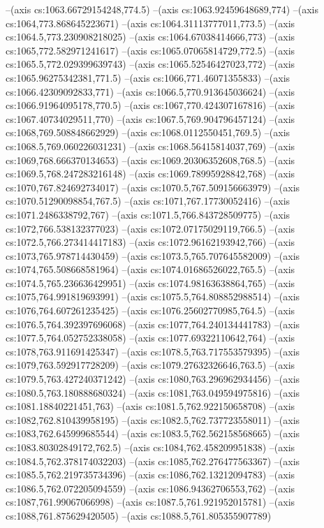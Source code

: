 --(axis cs:1063.66729154248,774.5)
--(axis cs:1063.92459648689,774)
--(axis cs:1064,773.868645223671)
--(axis cs:1064.31113777011,773.5)
--(axis cs:1064.5,773.230908218025)
--(axis cs:1064.67038414666,773)
--(axis cs:1065,772.582971241617)
--(axis cs:1065.07065814729,772.5)
--(axis cs:1065.5,772.029399639743)
--(axis cs:1065.52546427023,772)
--(axis cs:1065.96275342381,771.5)
--(axis cs:1066,771.46071355833)
--(axis cs:1066.42309092833,771)
--(axis cs:1066.5,770.913645036624)
--(axis cs:1066.91964095178,770.5)
--(axis cs:1067,770.424307167816)
--(axis cs:1067.40734029511,770)
--(axis cs:1067.5,769.904796457124)
--(axis cs:1068,769.508848662929)
--(axis cs:1068.0112550451,769.5)
--(axis cs:1068.5,769.060226031231)
--(axis cs:1068.56415814037,769)
--(axis cs:1069,768.666370134653)
--(axis cs:1069.20306352608,768.5)
--(axis cs:1069.5,768.247283216148)
--(axis cs:1069.78995928842,768)
--(axis cs:1070,767.824692734017)
--(axis cs:1070.5,767.509156663979)
--(axis cs:1070.51290098854,767.5)
--(axis cs:1071,767.17730052416)
--(axis cs:1071.2486338792,767)
--(axis cs:1071.5,766.843728509775)
--(axis cs:1072,766.538132377023)
--(axis cs:1072.07175029119,766.5)
--(axis cs:1072.5,766.273414417183)
--(axis cs:1072.96162193942,766)
--(axis cs:1073,765.978714430459)
--(axis cs:1073.5,765.707645582009)
--(axis cs:1074,765.508668581964)
--(axis cs:1074.01686526022,765.5)
--(axis cs:1074.5,765.236636429951)
--(axis cs:1074.98163638864,765)
--(axis cs:1075,764.991819693991)
--(axis cs:1075.5,764.808852988514)
--(axis cs:1076,764.607261235425)
--(axis cs:1076.25602770985,764.5)
--(axis cs:1076.5,764.392397696068)
--(axis cs:1077,764.240134441783)
--(axis cs:1077.5,764.052752338058)
--(axis cs:1077.69322110642,764)
--(axis cs:1078,763.911691425347)
--(axis cs:1078.5,763.717553579395)
--(axis cs:1079,763.592917728209)
--(axis cs:1079.27632326646,763.5)
--(axis cs:1079.5,763.427240371242)
--(axis cs:1080,763.296962934456)
--(axis cs:1080.5,763.180888680324)
--(axis cs:1081,763.049594975816)
--(axis cs:1081.18840221451,763)
--(axis cs:1081.5,762.922150658708)
--(axis cs:1082,762.810439958195)
--(axis cs:1082.5,762.737723558011)
--(axis cs:1083,762.645999685544)
--(axis cs:1083.5,762.562158568665)
--(axis cs:1083.80302849172,762.5)
--(axis cs:1084,762.458209951838)
--(axis cs:1084.5,762.378174032203)
--(axis cs:1085,762.276477563367)
--(axis cs:1085.5,762.219735734396)
--(axis cs:1086,762.13212094783)
--(axis cs:1086.5,762.072205094559)
--(axis cs:1086.94362706553,762)
--(axis cs:1087,761.99067066998)
--(axis cs:1087.5,761.921952015781)
--(axis cs:1088,761.875629420505)
--(axis cs:1088.5,761.805355907789)
